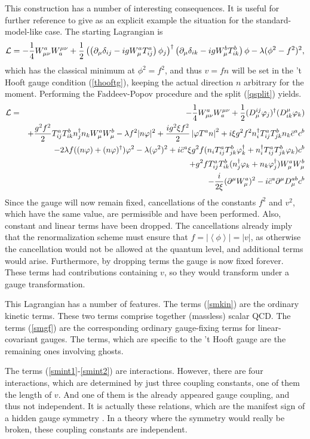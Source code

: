 \documentclass[final,12pt]{article}
\newcommand*{\La}{{\cal{L}}}
\newcommand*{\no}{\noindent}
\newcommand*{\bea}{\begin{eqnarray}}
\newcommand*{\eea}{\end{eqnarray}}
\newcommand*{\be}{\begin{equation}}
\newcommand*{\ee}{\end{equation}}
\newcommand*{\pd}{\partial}
\newcommand*{\pdm}{\pd_{\mu}}
\newcommand*{\pref}[1]{(\ref{#1})}
\newcommand*{\mn}{{\mu\nu}}
\newcommand*{\prefr}[2]{(\ref{#1}-\ref{#2})}
\newcommand*{\1}{1\!\!\!\bot}
\newcommand*{\la}{\left\langle}
\newcommand*{\ra}{\right\rangle}
\begin{document}
This construction has a number of interesting consequences. It is useful for further reference to give as an explicit example the situation for the standard-model-like case. The starting Lagrangian is
\be
\La=-\frac{1}{4}W_\mn^a W_a^\mn+\frac{1}{2}\left(\left(\pdm\delta_{ij}-igW_\mu^aT^a_{ij}\right)\phi_j\right)^\dagger\left(\pdm\delta_{ik}-igW_\mu^bT^b_{ik}\right)\phi-\lambda(\phi^2-f^2)^2\label{higgsyml},
\ee
\no which has the classical minimum at $\phi^2=f^2$, and thus $v=fn$ will be set in the 't Hooft gauge condition \pref{thooftg}, keeping the actual direction $n$ arbitrary for the moment. Performing the Faddeev-Popov procedure and the split \pref{qsplit} yields.
\bea
\La&=&-\frac{1}{4}W_\mn^a W_a^\mn+\frac{1}{2}(D_\mu^{ij}\varphi_j)^\dagger(D_{ik}^\mu\varphi_k)\label{smkin}\\
&&+\frac{g^2f^2}{2}T^a_{ij}T^b_{ik}n_j^\dagger n_kW_\mu^a W_\mu^b-\lambda f^2|n\varphi|^2+\frac{ig^2\xi f^2}{2}\left|\varphi T^an\right|^2+i\xi g^2f^2 n_i^\dagger T^a_{ij}T^b_{jk}n_k\bar{c}^a c^b\label{smmass}\\
&&-2\lambda f((n\varphi)+(n\varphi)^\dagger)\varphi^2-\lambda(\varphi^2)^2+i\bar{c}^a\xi g^2 f(n_iT^a_{ij}T^b_{jk}\varphi_k^\dagger+n_i^\dagger T^a_{ij}T^b_{jk}\varphi_k) c^b\label{smint1}\\
&&+g^2 fT^a_{ij}T^b_{ik}(n^\dagger_j\varphi_k+n_k\varphi_j^\dagger)W_\mu^aW_\mu^b\label{smint2}\\
&&-\frac{i}{2\xi}(\pd^\mu W_\mu^a)^2-i\bar{c}^a\pd^\mu D_\mu^{ab}c^b\label{smgf}
\eea
\no Since the gauge will now remain fixed, cancellations of the constants $f^2$ and $v^2$, which have the same value, are permissible and have been performed. Also, constant and linear terms have been dropped. The cancellations already imply that the renormalization scheme must ensure that $f=|\la\phi\ra|=|v|$, as otherwise the cancellation would not be allowed at the quantum level, and additional terms would arise. Furthermore, by dropping terms the gauge is now fixed forever. These terms had contributions containing $v$, so they would transform under a gauge transformation.

This Lagrangian has a number of features. The terms \pref{smkin} are the ordinary kinetic terms. These two terms comprise together (massless) scalar QCD. The terms \pref{smgf} are the corresponding ordinary gauge-fixing terms for linear-covariant gauges. The terms, which are specific to the 't Hooft gauge are the remaining ones involving ghosts.

The terms \prefr{smint1}{smint2} are interactions. However, there are four interactions, which are determined by just three coupling constants, one of them the length of $v$. And one of them is the already appeared gauge coupling, and thus not independent. It is actually these relations, which are the manifest sign of a hidden gauge symmetry \cite{O'Raifeartaigh:1978kv}. In a theory where the symmetry would really be broken, these coupling constants are independent.
\end{document}
